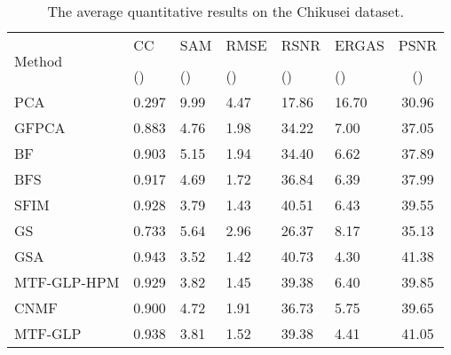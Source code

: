 \documentclass[journal]{IEEEtran}
\begin{document}
    \begin{table}[tb]
        \centering
        \caption{The average quantitative results on the Chikusei dataset.}
        \begin{tabular}{lp{0.5cm}p{0.5cm}p{0.6cm}p{0.5cm}p{0.6cm}c}
        \hline
        \multirow{3}{*}{Method}         & CC                & SAM               & RMSE                  & RSNR              & ERGAS             & PSNR  \\
                                        &                   &                   &       &                   &                   & \\
                                        & ()      & ()    &  ()       & ()      & ()    & ()\\
        \hline
        PCA\cite{PCA1}                  & 0.297            & 9.99            & 4.47            & 17.86           & 16.70            & 30.96\\
        GFPCA \cite{GFPCA}              & 0.883            & 4.76            & 1.98            & 34.22           & 7.00            & 37.05\\
        BF \cite{BF}                    & 0.903            & 5.15            & 1.94            & 34.40           & 6.62            & 37.89\\
        BFS \cite{BFS}                  & 0.917            & 4.69            & 1.72            & 36.84           & 6.39            & 37.99\\
        SFIM \cite{SFIM}                & 0.928            & 3.79            & 1.43            & 40.51           & 6.43            & 39.55\\
        GS\cite{GS}                     & 0.733            & 5.64            & 2.96            & 26.37           & 8.17            & 35.13\\
        GSA\cite{GS}                    & 0.943            & 3.52            & 1.42            & 40.73           & 4.30            & 41.38\\
        MTF-GLP-HPM \cite{MTF-GLP-HPM}  & 0.929            & 3.82            & 1.45            & 39.38           & 6.40            & 39.85\\
        CNMF \cite{CNMF}                & 0.900            & 4.72            & 1.91            & 36.73           & 5.75            & 39.65\\
        MTF-GLP \cite{MTF-GLP}          & 0.938            & 3.81            & 1.52            & 39.38           & 4.41            & 41.05\\

\end{tabular}
\end{table}
\end{document}
